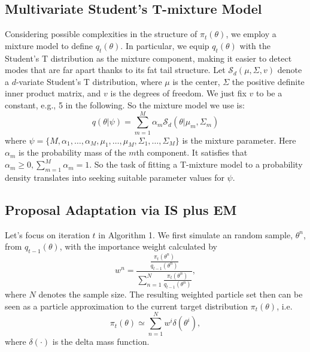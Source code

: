 \subsection{Multivariate Student's T-mixture Model}
Considering possible complexities in the structure of
$\pi_t(\theta)$, we employ a mixture model to define
$q_{t}(\theta)$.  In particular, we equip
$q_{t}(\theta)$ with the Student's T distribution as the mixture
component, making it easier to detect modes that are far apart
thanks to its fat tail structure. Let $\mathcal{S}_d(\mu,\Sigma,v)$
denote a $d$-variate Student's T distribution, where $\mu$ is the
center, $\Sigma$ the positive definite inner product matrix, and $v$
is the degrees of freedom. We just fix $v$ to be a constant, e.g., 5
in the following. So the mixture model we use is:
\begin{equation}\label{Definition_mixture}
q(\theta|\psi)=\sum\limits_{m=1}^M \alpha_{m}
\mathcal{S}_d(\theta|\mu_m,\Sigma_m)
\end{equation}
where
$\psi=\{M,\alpha_1,\ldots,\alpha_M,\mu_1,\ldots,\mu_M,\Sigma_1,\ldots,\Sigma_M\}$
is the mixture parameter. Here $\alpha_m$ is the probability mass of
the $m$th component. It satisfies that $\alpha_{m}\geq
0,\sum_{m=1}^M \alpha_{m}=1$. So the task of fitting a T-mixture
model to a probability density translates into seeking suitable
parameter values for $\psi$.

\subsection {Proposal Adaptation via IS plus EM}\label{sec:IS_EM}
Let's focus on iteration $t$ in Algorithm 1. We first simulate an
random sample, $\theta^n$, from $q_{t-1}(\theta)$, with the
importance weight calculated by
\begin{equation}
w^n=\frac{\frac{\pi_{t}(\theta^n)}{q_{t-1}(\theta^n)}}{\sum_{n=1}^N\frac{\pi_{t}(\theta^n)}{q_{t-1}(\theta^n)}},
\end{equation}
where $N$ denotes the sample size. The resulting weighted particle
set then can be seen as a particle approximation to the current
target distribution $\pi_t(\theta)$, i.e.
\begin{equation}\label{delta_mass_approx}
\pi_t(\theta)\simeq\sum\limits_{n=1}^Nw^i\delta(\theta^i),
\end{equation}
where $\delta(\cdot)$ is the delta mass function.

